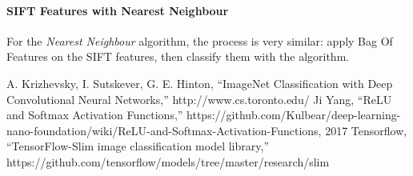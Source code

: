 \documentclass[conference]{IEEEtran}
\begin{document}
\paragraph{SIFT Features with Nearest Neighbour}
    For the \emph{Nearest Neighbour} algorithm, the process is very similar: apply Bag Of Features on the SIFT features, then classify them with the algorithm.


\begin{thebibliography}{00}
 A. Krizhevsky, I. Sutskever, G. E. Hinton, ``ImageNet Classification with Deep Convolutional Neural Networks,'' http://www.cs.toronto.edu/%
 Ji Yang, ``ReLU and Softmax Activation Functions,'' https://github.com/Kulbear/deep-learning-nano-foundation/wiki/ReLU-and-Softmax-Activation-Functions, 2017
 Tensorflow, ``TensorFlow-Slim image classification model library,'' https://github.com/tensorflow/models/tree/master/research/slim
\end{thebibliography}
\vspace{12pt}
\color{red}
\end{document}
